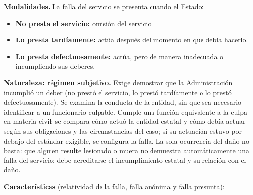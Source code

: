 \textbf{Modalidades.} La falla del servicio se presenta cuando el Estado:

\begin{itemize}
\item \textbf{No presta el servicio:} omisión del servicio.
\item \textbf{Lo presta tardíamente:} actúa después del momento en que debía hacerlo.
\item \textbf{Lo presta defectuosamente:} actúa, pero de manera inadecuada o incumpliendo sus deberes.
\end{itemize}
\textbf{Naturaleza: régimen subjetivo.} Exige demostrar que la Administración incumplió un deber (no prestó el servicio, lo prestó tardíamente o lo prestó defectuosamente). Se examina la conducta de la entidad, sin que sea necesario identificar a un funcionario culpable. Cumple una función equivalente a la culpa en materia civil: se compara cómo actuó la entidad estatal y cómo debía actuar según sus obligaciones y las circunstancias del caso; si su actuación estuvo por debajo del estándar exigible, se configura la falla. La sola ocurrencia del daño no basta: que alguien resulte lesionado o muera no demuestra automáticamente una falla del servicio; debe acreditarse el incumplimiento estatal y su relación con el daño.

\textbf{Características} (relatividad de la falla, falla anónima y falla presunta):

